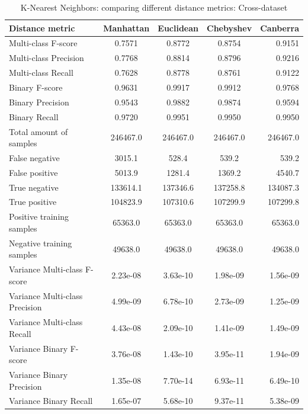 \begin{table}[H]
\caption{K-Nearest Neighbors: comparing different distance metrics: Cross-dataset}
\label{tab:knn:dis}
\centering
\begin{tabular}{l c c c r}
\toprule
Distance metric & Manhattan & Euclidean & Chebyshev & Canberra \\
\midrule
Multi-class F-score & 0.7571 & 0.8772 & 0.8754 & 0.9151\\
Multi-class Precision & 0.7768 & 0.8814 & 0.8796 & 0.9216\\
Multi-class Recall & 0.7628 & 0.8778 & 0.8761 & 0.9122\\
\midrule
Binary F-score & 0.9631 & 0.9917 & 0.9912 & 0.9768\\
Binary Precision & 0.9543 & 0.9882 & 0.9874 & 0.9594 \\
Binary Recall & 0.9720 & 0.9951 & 0.9950 & 0.9950 \\
\midrule
Total amount of samples & 246467.0 & 246467.0 & 246467.0 & 246467.0\\
False negative & 3015.1 & 528.4 & 539.2 & 539.2 \\
False positive & 5013.9 & 1281.4 & 1369.2 & 4540.7 \\
True negative & 133614.1 & 137346.6 & 137258.8 & 134087.3 \\
True positive & 104823.9 & 107310.6 & 107299.9 & 107299.8\\
\midrule
Positive training samples & 65363.0 & 65363.0 & 65363.0 & 65363.0 \\
Negative training samples & 49638.0 & 49638.0 & 49638.0 & 49638.0\\
\midrule
Variance Multi-class F-score & 2.23e-08 & 3.63e-10 & 1.98e-09 & 1.56e-09\\
Variance Multi-class Precision & 4.99e-09 & 6.78e-10 & 2.73e-09 & 1.25e-09\\
Variance Multi-class Recall & 4.43e-08 & 2.09e-10 & 1.41e-09 &  1.49e-09\\
\midrule
Variance Binary F-score & 3.76e-08 & 1.43e-10 & 3.95e-11 & 1.94e-09\\
Variance Binary Precision & 1.35e-08 & 7.70e-14 & 6.93e-11 & 6.49e-10\\
Variance Binary Recall & 1.65e-07 & 5.68e-10 & 9.37e-11 & 5.38e-09\\
\bottomrule
\end{tabular}
\end{table}

